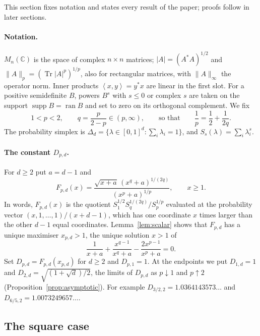 \documentclass[11pt,a4paper]{article}
\numberwithin{equation}{section}
\theoremstyle{definition}
\theoremstyle{remark}
\DeclareMathOperator{\Tr}{Tr}
\DeclareMathOperator{\supp}{supp}
\newcommand{\C}{\mathbb C}
\newcommand{\ip}[2]{\left\langle #1,#2\right\rangle}
\begin{document}
This section fixes notation and states every result of the paper;
proofs follow in later sections.

\paragraph{Notation.}
\(M_n(\C)\) is the space of complex \(n\times n\) matrices;
\(|A|=(A^*A)^{1/2}\) and \(\|A\|_p=(\Tr|A|^p)^{1/p}\), also for
rectangular matrices, with \(\|A\|_\infty\) the operator norm. Inner
products \(\ip{x}{y}=y^*x\) are linear in the first slot. For a
positive semidefinite \(B\), powers \(B^s\) with \(s\le0\) or complex
\(s\) are taken on the support \(\supp B=\operatorname{ran}B\) and set
to zero on its orthogonal complement. We fix
\begin{equation}\label{eq:q}
 1<p<2,\qquad q=\frac{p}{2-p}\in(p,\infty),
 \qquad\text{so that}\qquad \frac1p=\frac12+\frac1{2q}.
\end{equation}
The probability simplex is
\(\Delta_d=\{\lambda\in[0,1]^d:\sum_i\lambda_i=1\}\), and
\(S_s(\lambda)=\sum_i\lambda_i^s\).

\paragraph{The constant \(D_{p,d}\).}
For \(d\ge2\) put \(a=d-1\) and
\begin{equation}\label{eq:F}
 F_{p,d}(x)=
 \frac{\sqrt{x+a}\,(x^q+a)^{1/(2q)}}{(x^p+a)^{1/p}},
 \qquad x\ge1.
\end{equation}
In words, \(F_{p,d}(x)\) is the quotient
\(S_1^{1/2}S_q^{1/(2q)}/S_p^{1/p}\) evaluated at the probability vector
\((x,1,\ldots,1)/(x+d-1)\), which has one coordinate \(x\) times
larger than the other \(d-1\) equal coordinates. Lemma~\ref{lem:scalar}
shows that \(F_{p,d}\) has a unique maximiser \(x_{p,d}>1\), the unique
solution \(x>1\) of
\begin{equation}\label{eq:critical}
 \frac{1}{x+a}+\frac{x^{q-1}}{x^q+a}-\frac{2x^{p-1}}{x^p+a}=0.
\end{equation}
Set \(D_{p,d}=F_{p,d}(x_{p,d})\) for \(d\ge2\) and \(D_{p,1}=1\). At the endpoints we put
\(D_{1,d}=1\) and \(D_{2,d}=\sqrt{(1+\sqrt d)/2}\), the limits of \(D_{p,d}\) as
\(p\downarrow1\) and \(p\uparrow2\) (Proposition~\ref{prop:asymptotic}). For
example \(D_{3/2,2}=1.0364143573\ldots\) and \(D_{6/5,2}=1.0073249657\ldots\).

\subsection{The square case}
\end{document}
